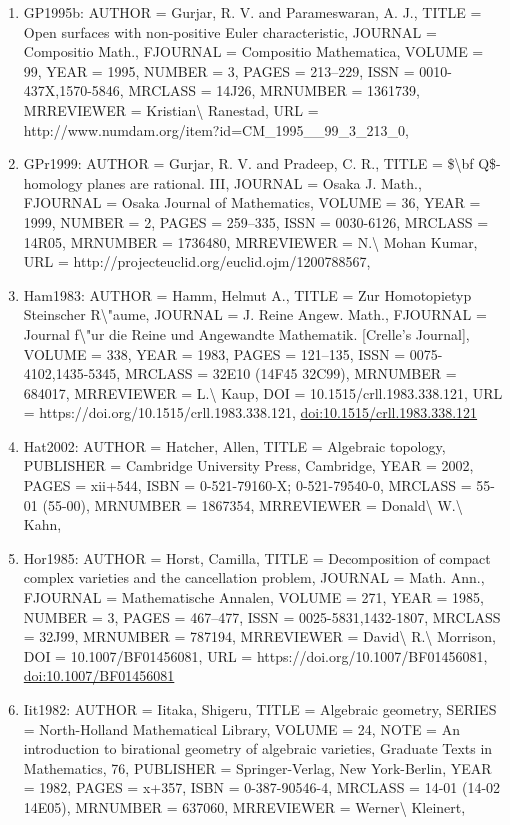 \documentclass[11pt]{article}
\begin{document}
\begin{enumerate}[leftmargin=*]
  \item GP1995b: AUTHOR = Gurjar, R. V. and Parameswaran, A. J., TITLE = Open surfaces with non-positive Euler characteristic, JOURNAL = Compositio Math., FJOURNAL = Compositio Mathematica, VOLUME = 99, YEAR = 1995, NUMBER = 3, PAGES = 213--229, ISSN = 0010-437X,1570-5846, MRCLASS = 14J26, MRNUMBER = 1361739, MRREVIEWER = Kristian\textbackslash{} Ranestad, URL = http://www.numdam.org/item?id=CM\_1995\_\_99\_3\_213\_0,
  \item GPr1999: AUTHOR = Gurjar, R. V. and Pradeep, C. R., TITLE = \$\textbackslash{}bf Q\$-homology planes are rational. III, JOURNAL = Osaka J. Math., FJOURNAL = Osaka Journal of Mathematics, VOLUME = 36, YEAR = 1999, NUMBER = 2, PAGES = 259--335, ISSN = 0030-6126, MRCLASS = 14R05, MRNUMBER = 1736480, MRREVIEWER = N.\textbackslash{} Mohan Kumar, URL = http://projecteuclid.org/euclid.ojm/1200788567,
  \item Ham1983: AUTHOR = Hamm, Helmut A., TITLE = Zur Homotopietyp Steinscher R\textbackslash{}"aume, JOURNAL = J. Reine Angew. Math., FJOURNAL = Journal f\textbackslash{}"ur die Reine und Angewandte Mathematik. [Crelle's Journal], VOLUME = 338, YEAR = 1983, PAGES = 121--135, ISSN = 0075-4102,1435-5345, MRCLASS = 32E10 (14F45 32C99), MRNUMBER = 684017, MRREVIEWER = L.\textbackslash{} Kaup, DOI = 10.1515/crll.1983.338.121, URL = https://doi.org/10.1515/crll.1983.338.121, \href{https://doi.org/10.1515/crll.1983.338.121}{doi:10.1515/crll.1983.338.121}
  \item Hat2002: AUTHOR = Hatcher, Allen, TITLE = Algebraic topology, PUBLISHER = Cambridge University Press, Cambridge, YEAR = 2002, PAGES = xii+544, ISBN = 0-521-79160-X; 0-521-79540-0, MRCLASS = 55-01 (55-00), MRNUMBER = 1867354, MRREVIEWER = Donald\textbackslash{} W.\textbackslash{} Kahn,
  \item Hor1985: AUTHOR = Horst, Camilla, TITLE = Decomposition of compact complex varieties and the cancellation problem, JOURNAL = Math. Ann., FJOURNAL = Mathematische Annalen, VOLUME = 271, YEAR = 1985, NUMBER = 3, PAGES = 467--477, ISSN = 0025-5831,1432-1807, MRCLASS = 32J99, MRNUMBER = 787194, MRREVIEWER = David\textbackslash{} R.\textbackslash{} Morrison, DOI = 10.1007/BF01456081, URL = https://doi.org/10.1007/BF01456081, \href{https://doi.org/10.1007/BF01456081}{doi:10.1007/BF01456081}
  \item Iit1982: AUTHOR = Iitaka, Shigeru, TITLE = Algebraic geometry, SERIES = North-Holland Mathematical Library, VOLUME = 24, NOTE = An introduction to birational geometry of algebraic varieties, Graduate Texts in Mathematics, 76, PUBLISHER = Springer-Verlag, New York-Berlin, YEAR = 1982, PAGES = x+357, ISBN = 0-387-90546-4, MRCLASS = 14-01 (14-02 14E05), MRNUMBER = 637060, MRREVIEWER = Werner\textbackslash{} Kleinert,

\end{enumerate}
\end{document}
